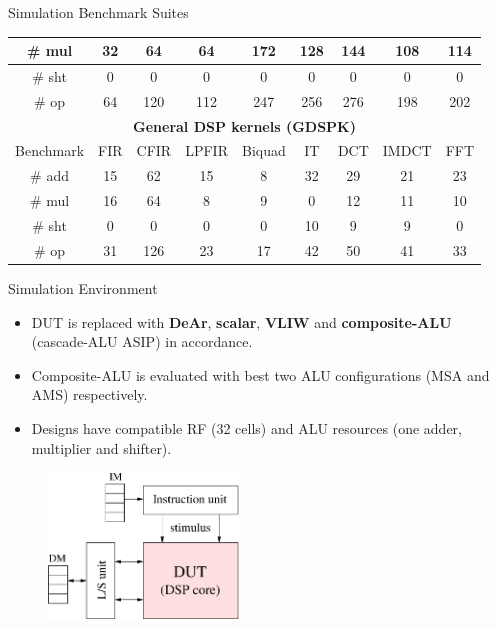 \documentclass{beamer}
\begin{document}
\begin{CJK}{UTF8}{bkai}
\begin{frame}{Simulation Benchmark Suites}
\begin{table}[!ht]
{\begin{tabular}{|c|c|c|c|c|c|c|c|c|}
                        \# mul            &  32    &  64    &   64    &   172    &  128   & 144  &  108   & 114   \\ \hline
                        \# sht            &   0    &   0    &    0    &     0    &    0   &   0  &    0   &   0   \\ \hline
                        \# op             &  64    & 120    &  112    &   247    &  256   & 276  &  198   & 202   \\ \hline
                        \multicolumn{9}{|c|}{\textbf{General DSP kernels (GDSPK)}}                     \\ \hline
                        Benchmark              & FIR    & CFIR   & LPFIR   & Biquad   & IT     & DCT  & IMDCT  & FFT   \\ \hline
                        \# add            & 15     &  62    &   15    &    8     &  32    &  29  &   21   &  23   \\ \hline
                        \# mul            & 16     &  64    &    8    &    9     &   0    &  12  &   11   &  10   \\ \hline
                        \# sht            &  0     &   0    &    0    &    0     &  10    &   9  &    9   &   0   \\ \hline
                        \# op             & 31     & 126    &   23    &   17     &  42    &  50  &   41   &  33   \\ \hline
                    \end{tabular}
                }
            \end{table}
    \end{frame}

    \begin{frame}{Simulation Environment}
            \begin{itemize}
                \item DUT is replaced with \textbf{DeAr}, \textbf{scalar}, \textbf{VLIW} and \textbf{composite-ALU} (cascade-ALU ASIP) in accordance.
                \item Composite-ALU is evaluated with best two ALU configurations (MSA and AMS) respectively.
                \item Designs have compatible RF (32 cells) and ALU resources (one adder, multiplier and shifter).
            \end{itemize}
            \begin{figure}[!ht] 
                \centering
                \includegraphics[width=0.45\textwidth]{./figs/sim.eps}
            \end{figure}
    \end{frame}


\end{CJK}
\end{document}
